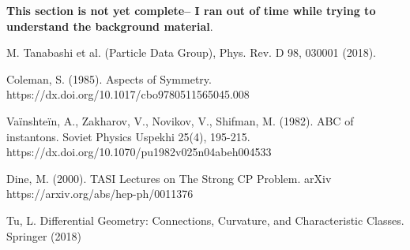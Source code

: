 \documentclass[11pt, oneside]{article}   	%
\theoremstyle{definition}
\begin{document}
\textbf{This section is not yet complete-- I ran out of time while trying to understand the background material}. 



\newpage
\begin{thebibliography}{99}

M. Tanabashi et al. (Particle Data Group), Phys. Rev. D 98, 030001 (2018).

Coleman, S. (1985). Aspects of Symmetry. https://dx.doi.org/10.1017/cbo9780511565045.008

Va\"{i}nshte\"{i}n, A., Zakharov, V., Novikov, V., Shifman, M. (1982). ABC of instantons. Soviet Physics Uspekhi  25(4), 195-215. https://dx.doi.org/10.1070/pu1982v025n04abeh004533

Dine, M. (2000). TASI Lectures on The Strong CP Problem. arXiv https://arxiv.org/abs/hep-ph/0011376

Tu, L. Differential Geometry: Connections, Curvature, and Characteristic Classes. Springer (2018)

\end{thebibliography}
\end{document}
